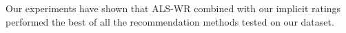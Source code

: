 Our experiments have shown that ALS-WR combined with our implicit ratings performed the best of all the recommendation
methods tested on our dataset.




%
